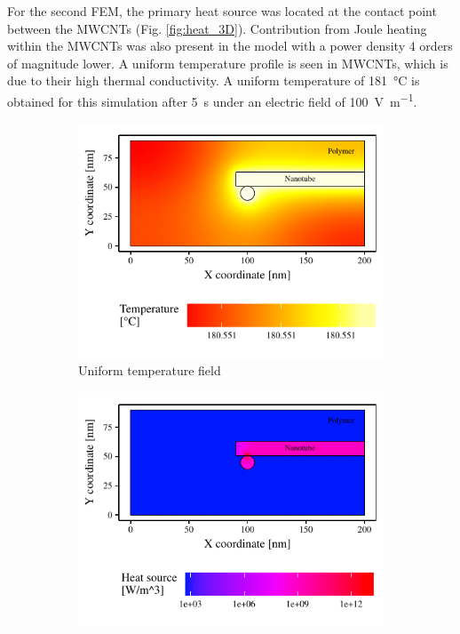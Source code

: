 \documentclass[11pt,review,times]{article}
\begin{document}
For the second FEM, the primary heat source was located at the contact point between the MWCNTs (Fig. \ref{fig:heat_3D}). 
Contribution from Joule heating within the MWCNTs was also present in the model with a power density 4 orders of magnitude lower. 
A uniform temperature profile is seen in MWCNTs, which is due to their high thermal conductivity. 
A uniform temperature of \SI{181}{\celsius} is obtained for this simulation after \SI{5}{\second} under an electric field of \SI{100}{\volt\per\metre}. 

\begin{figure}[htb]
	\centering
	\captionsetup{width=\textwidth}
	\begin{subfigure}{0.49\textwidth}
		\centering
		\captionsetup{width=0.9\textwidth}
		\includegraphics[width=\textwidth]{resultats_comsol_3D_temp}
		\caption{Uniform temperature field}
		\label{fig:temp_3D}
	\end{subfigure}
	\begin{subfigure}{0.49\textwidth}
		\centering
		\captionsetup{width=0.9\textwidth}
		\includegraphics[width=\textwidth]{resultats_comsol_3D_puissance_log}

\end{subfigure}
\end{figure}
\end{document}
